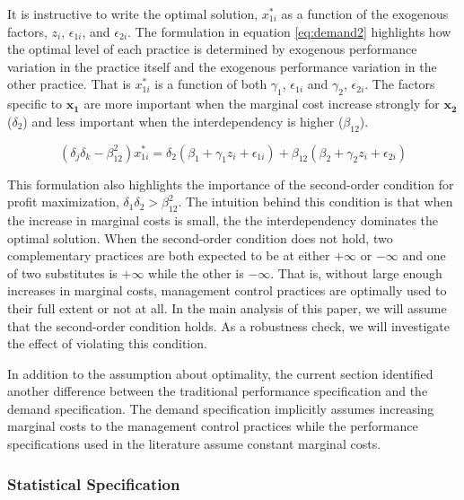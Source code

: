 \documentclass[12pt]{article}
\begin{document}
It is instructive to write the optimal solution, \(x^*_{1i}\) as a
function of the exogenous factors, \(z_i\), \(\epsilon_{1i}\), and
\(\epsilon_{2i}\). The formulation in equation \eqref{eq:demand2}
highlights how the optimal level of each practice is determined by
exogenous performance variation in the practice itself and the exogenous
performance variation in the other practice. That is \(x^*_{1i}\) is a
function of both \(\gamma_1\), \(\epsilon_{1i}\) and \(\gamma_2\),
\(\epsilon_{2i}\). The factors specific to \(\mathbf{x_1}\) are more
important when the marginal cost increase strongly for \(\mathbf{x_2}\)
(\(\delta_2\)) and less important when the interdependency is higher
(\(\beta_{12}\)).

\begin{equation}\label{eq:demand2}
(\delta_j \delta_k - \beta_{12}^2) x^*_{1i}
    =  \delta_2 (\beta_1 + \gamma_1 z_i + \epsilon_{1i}) +
       \beta_{12} (\beta_2 + \gamma_2 z_i + \epsilon_{2i})
\end{equation}

This formulation also highlights the importance of the second-order
condition for profit maximization, \(\delta_1 \delta_2 > \beta_{12}^2\).
The intuition behind this condition is that when the increase in
marginal costs is small, the the interdependency dominates the optimal
solution. When the second-order condition does not hold, two
complementary practices are both expected to be at either \(+\infty\) or
\(-\infty\) and one of two substitutes is \(+\infty\) while the other is
\(-\infty\). That is, without large enough increases in marginal costs,
management control practices are optimally used to their full extent or
not at all. In the main analysis of this paper, we will assume that the
second-order condition holds. As a robustness check, we will investigate
the effect of violating this condition.

In addition to the assumption about optimality, the current section
identified another difference between the traditional performance
specification and the demand specification. The demand specification
implicitly assumes increasing marginal costs to the management control
practices while the performance specifications used in the literature
assume constant marginal costs.

\subsubsection{Statistical
Specification}\label{statistical-specification}
\end{document}
